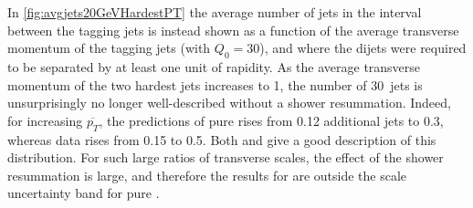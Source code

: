 In \cref{fig:avgjets20GeVHardestPT} the average number of jets in the interval between
the tagging jets is instead shown as a function of the average transverse
momentum of the tagging jets (with $Q_0 = 30$\GeV), and where the dijets were
required to be separated by at least one unit of rapidity.
 As the average transverse momentum of the two
hardest jets increases to 1\TeV, the number of 30\GeV\ jets is unsurprisingly no
longer well-described without a shower resummation. Indeed, for increasing
$\overline{p_T}$, the predictions of pure \HEJ rises from 0.12 additional jets
to 0.3, whereas data rises from 0.15 to 0.5. Both \py and \HEJpy give a good
description of this distribution. For such large ratios of transverse scales,
the effect of the shower resummation is large, and therefore the results for 
\HEJpy are outside the scale uncertainty band for pure \HEJ.
% 
% 



